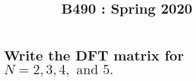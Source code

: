 \documentclass[11pt]{article}
\title{
    \vspace{2in}
    \textmd{\textbf{\tit}}\\
    \normalsize\vspace{0.1in}\small{B490 : Spring 2020 }\\
    \vspace{0.1in}\large{\textit{\auths}}
    \vspace{3in}
}
\date{}
\begin{document}
\maketitle
\pagebreak



\section{Write the DFT matrix for $N = 2,3,4, \text{ and } 5.$}
\end{document}
